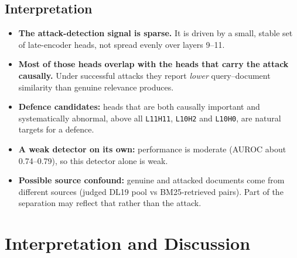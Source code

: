 \documentclass[11pt]{article}
\begin{document}
\subsection{Interpretation}

\begin{itemize}[nosep]
  \item \textbf{The attack-detection signal is sparse.} It is driven by a small, stable set
        of late-encoder heads, not spread evenly over layers 9--11.
  \item \textbf{Most of those heads overlap with the heads that carry the attack
        causally.} Under successful attacks they report \emph{lower} query--document
        similarity than genuine relevance produces.
  \item \textbf{Defence candidates:} heads that are both causally important and
        systematically abnormal, above all \texttt{L11H11}, \texttt{L10H2} and
        \texttt{L10H0}, are natural targets for a defence.
  \item \textbf{A weak detector on its own:} performance is moderate (AUROC about
        0.74--0.79), so this detector alone is weak.
  \item \textbf{Possible source confound:} genuine and attacked documents come from
        different sources (judged DL19 pool vs BM25-retrieved pairs). Part of the
        separation may reflect that rather than the attack.
\end{itemize}

\section{Interpretation and Discussion}
\end{document}
